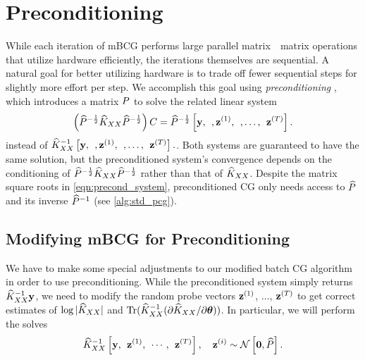 \section{Preconditioning}
\label{sec:preconditioning}

While each iteration of mBCG performs large parallel matrix~\texttimes~matrix operations that utilize hardware efficiently, the iterations themselves are sequential.
A natural goal for better utilizing hardware is to trade off fewer sequential steps for slightly more effort per step.
We accomplish this goal using \emph{preconditioning} \citep[e.g.][]{demmel1997applied,saad2003iterative,van2003iterative,golub2012matrix}, which introduces a matrix $P$ to solve the related linear system
\begin{equation}
  \left( \widehat{P}^{- \frac 1 2} \widehat{K}_{XX} \widehat{P}^{- \frac 1 2}\right) C = \widehat{P}^{- \frac 1 2} \left[ \mathbf{y}, \:\:, \mathbf{z}^{(1)}, \:\:, \ldots, \:\: \mathbf{z}^{(T)} \right].
  \label{eqn:precond_system}
\end{equation}
instead of $\widehat{K}_{XX}^{-1} \left[  \mathbf{y}, \:\:, \mathbf{z}^{(1)}, \:\:, \ldots, \:\: \mathbf{z}^{(T)} \right].$.
Both systems are guaranteed to have the same solution, but the preconditioned system's convergence depends on the conditioning of $\widehat{P}^{- \frac 1 2} \widehat{K}_{XX} \widehat{P}^{- \frac 1 2}$ rather than that of $\widehat{K}_{XX}$.
Despite the matrix square roots in \cref{eqn:precond_system}, preconditioned CG only needs access to $\widehat{P}$ and its inverse $\widehat{P}^{-1}$ (see \cref{alg:std_pcg}).



\subsection{Modifying mBCG for Preconditioning}
\label{sec:precond_requirements}
We have to make some special adjustments to our modified batch CG algorithm in order to use preconditioning.
While the preconditioned system simply returns $\widehat{K}_{XX}^{-1} \mathbf{y}$, we need to modify the random probe vectors $\mathbf{z}^{(1)}$, $\ldots$, $\mathbf{z}^{(T)}$ to get correct estimates of $\log \vert \widehat{K}_{XX} \vert$ and $\tr{ \trainK^{-1} ( \partial \trainK / \partial \btheta) }$.
In particular, we will perform the solves
%
\begin{equation}
  \label{eqn:mod_cg_call_precond}
  \trainK^{-1} \left[ \by, \:\: \bz^{(1)}, \:\: \cdots, \:\: \bz^{(T)} \right], \quad \bz^{(i)} \sim \normaldist{\bzero}{\trainP}.
\end{equation}

